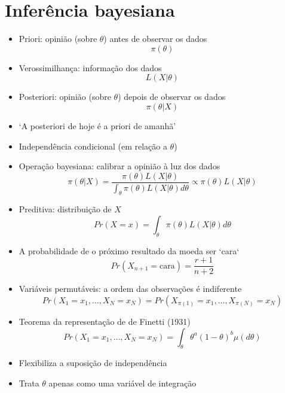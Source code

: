 \documentclass{beamer}
\begin{document}
\section{Inferência bayesiana}
\begin{frame}{\secname}
    \begin{itemize}
    \item Priori: opinião (sobre $\theta$) antes de observar os dados \[ \pi(\theta) \]
    \pause
    \item Verossimilhança: informação dos dados \[ L(X|\theta) \]
    \pause
    \item Posteriori: opinião (sobre $\theta$) depois de observar os dados \[ \pi(\theta|X) \]
    \end{itemize}
\end{frame}

\begin{frame}{\secname}
    \begin{itemize}
    \item `A posteriori de hoje é a priori de amanhã'
    \pause
    \item Independência condicional (em relação a $\theta$)
    \pause
    \item Operação bayesiana: calibrar a opinião à luz dos dados \[ \pi(\theta|X) = \frac{\pi(\theta) L(X|\theta)}{\int_{\theta} \pi(\theta) L(X|\theta) d\theta} \propto \pi(\theta) L(X|\theta) \]
    \pause
    \item Preditiva: distribuição de $X$ \[ Pr(X=x) = \int_{\theta} \pi(\theta) L(X|\theta) d\theta \]
    \pause
    \item A probabilidade de o próximo resultado da moeda ser `cara` \[ Pr(X_{n+1}=\textrm{cara}) = \frac{r+1}{n+2} \]
    \end{itemize}
\end{frame}

\begin{frame}{\secname}
    \begin{itemize}
    \item Variáveis permutáveis: a ordem das observações é indiferente \[ Pr(X_1=x_1, \ldots, X_N=x_N) = Pr(X_{\pi(1)}=x_1, \ldots, X_{\pi(N)}=x_N)  \]
    \pause
    \item Teorema da representação de de Finetti (1931) \[ Pr(X_1=x_1, \ldots, X_N=x_N) = \int_{\theta} \theta^a (1-\theta)^b \mu(d\theta) \]
    \pause
    \item Flexibiliza a suposição de independência
    \pause
    \item Trata $\theta$ apenas como uma variável de integração
    \end{itemize}
\end{frame}
\end{document}
